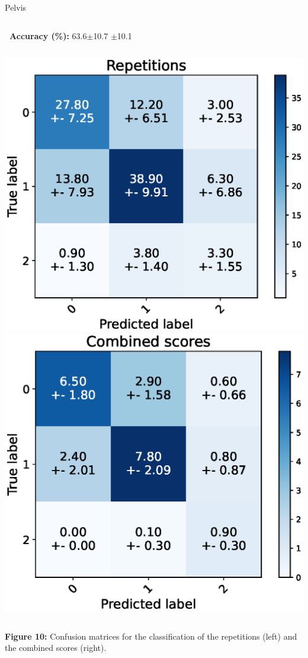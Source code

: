 \begin{frame}[fragile]{Pelvis}
  \begin{columns}
    \textbf{\small~Accuracy (\%):} 63.6$\pm$10.7
    \vspace{0.3cm}
    $\pm$10.1
    \vspace{0.3cm}
  \end{columns}
  \begin{columns}
    \centering
    \includegraphics[width=\textwidth]{files/figs/res/pelvis/cnf-reps.eps}
    \centering
    \includegraphics[width=\textwidth]{files/figs/res/pelvis/cnf-combined.eps}
  \end{columns}
  {\scriptsize\newline\textbf{Figure 10:} Confusion matrices for the classification of the repetitions (left) and the combined scores (right).}
\end{frame}

